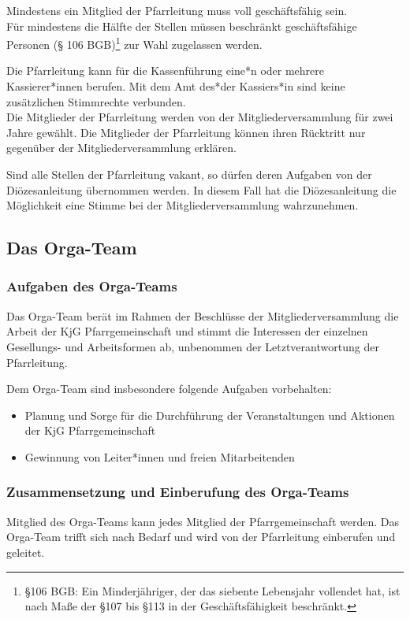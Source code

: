 \documentclass[12pt]{report}
\begin{document}
\begin{flushleft}
Mindestens ein Mitglied der Pfarrleitung muss voll geschäftsfähig sein.\\
Für mindestens die Hälfte der Stellen müssen beschränkt geschäftsfähige Personen (§ 106 BGB)\footnote{§106 BGB: Ein Minderjähriger, der das siebente Lebensjahr vollendet hat, ist nach Maße der §107 bis §113 in
der Geschäftsfähigkeit beschränkt.} zur Wahl zugelassen werden.

Die Pfarrleitung kann für die Kassenführung eine*n oder mehrere Kassierer*innen berufen.
Mit dem Amt des*der Kassiers*in sind keine zusätzlichen Stimmrechte verbunden.\\

Die Mitglieder der Pfarrleitung werden von der Mitgliederversammlung für
zwei Jahre gewählt.
Die Mitglieder der Pfarrleitung können ihren Rücktritt nur
gegenüber der Mitgliederversammlung erklären.

Sind alle Stellen der Pfarrleitung vakant, so dürfen deren Aufgaben von der
Diözesanleitung übernommen werden. In diesem Fall hat die Diözesanleitung die Möglichkeit eine
Stimme bei der Mitgliederversammlung wahrzunehmen.

\subsection{Das Orga-Team}

\subsubsection{Aufgaben des Orga-Teams}

Das Orga-Team berät im Rahmen der Beschlüsse der Mitgliederversammlung die Arbeit der KjG
Pfarrgemeinschaft und stimmt die Interessen der einzelnen Gesellungs- und Arbeitsformen ab,
unbenommen der Letztverantwortung der Pfarrleitung.

Dem Orga-Team sind insbesondere folgende Aufgaben vorbehalten:
\begin{itemize}
  \item Planung und Sorge für die Durchführung der Veranstaltungen und Aktionen der KjG Pfarrgemeinschaft
  \item Gewinnung von Leiter*innen und freien Mitarbeitenden
\end{itemize}

\subsubsection{Zusammensetzung und Einberufung des Orga-Teams}
Mitglied des Orga-Teams kann jedes Mitglied der Pfarrgemeinschaft werden. Das Orga-Team
trifft sich nach Bedarf und wird von der Pfarrleitung einberufen und geleitet.


\end{flushleft}
\end{document}
